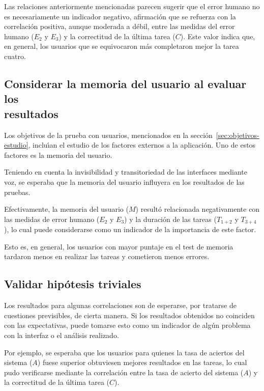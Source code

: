 Las relaciones anteriormente mencionadas parecen sugerir que el error humano no es necesariamente
un indicador negativo, afirmaci\'on que se refuerza con la correlaci\'on positiva, aunque moderada
a d\'ebil, entre las medidas del error humano ($E_2$ y $E_3$) y la correctitud de la \'ultima tarea ($C$).
Este valor indica que, en general, los usuarios que se equivocaron m\'as completaron mejor la tarea 
cuatro.

\subsection[Considerar la memoria del usuario al evaluar los resultados]
{Considerar la memoria del usuario al evaluar los \\ resultados}
Los objetivos de la prueba con usuarios, mencionados en la secci\'on~\ref{sec:objetivos-estudio},
inclu{\'\i}an el estudio de los factores externos a la aplicaci\'on. Uno de estos factores
es la memoria del usuario.

Teniendo en cuenta la invisibilidad y transitoriedad de las interfaces mediante
voz, se esperaba que la memoria del usuario influyera en los resultados de
las pruebas.

Efectivamente, la memoria del usuario ($M$) result\'o relacionada negativamente con las medidas 
de error humano ($E_2$ y $E_3$) y la duraci\'on de las tareas ($T_{1+2}$ y $T_{3+4}$), lo cual 
puede considerarse como un indicador de la importancia de este factor.

Esto es, en general, los usuarios con mayor puntaje en el test de memoria
tardaron menos en realizar las tareas y cometieron menos errores.

\subsection[Validar hip\'otesis triviales]
{Validar hip\'otesis triviales}

Los resultados para algunas correlaciones son de esperarse, por tratarse de cuestiones
previsibles, de cierta manera. Si los resultados obtenidos no coinciden con las expectativas,
puede tomarse esto como un indicador de alg\'un problema con la interfaz o el an\'alisis realizado. 

Por ejemplo, se esperaba que los usuarios para quienes la tasa de aciertos del sistema ($A$) fuese
superior obtuviesen mejores resultados en las tareas, lo cual pudo verificarse mediante la 
correlaci\'on entre la tasa de acierto del sistema ($A$) y la correctitud de la \'ultima tarea ($C$).

